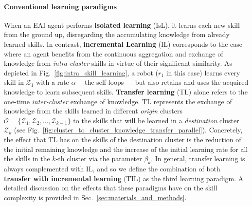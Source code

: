 \documentclass[12pt]{article}
\renewcommand{\emph}[1]{\textit{#1}}
\begin{document}
\paragraph*{Conventional learning paradigms} 
When an EAI agent performs \textbf{isolated learning} (IsL), it learns each new skill from the ground up, disregarding the accumulating knowledge from already learned skills. In contrast, \textbf{incremental Learning} (IL) corresponds to the case where an agent benefits from the continuous aggregation and exchange of knowledge from \emph{intra-cluster} skills in virtue of their significant similarity. As depicted in Fig.~\ref{fig:intra_skill_learning}, a robot ($r_1$ in this case) learns every skill in $\mathcal{Z}_1$ with a rate $\alpha$ ---the self-loops --- but also retains and uses the acquired knowledge to learn subsequent skills. \textbf{Transfer learning} (TL) alone refers to the one-time \emph{inter-cluster} exchange of knowledge. TL represents the exchange of knowledge from the skills learned in different \emph{origin} clusters $\mathcal{O} = \{ \mathcal{Z}_1,\mathcal{Z}_2,\ldots,\mathcal{Z}_{k-1} \}$ to the skills that will be learned in a \emph{destination} cluster $\mathcal{Z}_k$ (see Fig.~\ref{fig:cluster_to_cluster_knowledge_transfer_parallel}). Concretely, the effect that TL has on the skills of the destination cluster is the reduction of the initial remaining knowledge and the increase of the initial learning rate for all the skills in the $k$-th cluster via the parameter $\beta_k$. In general, transfer learning is always complemented with IL, and so we define the combination of both \textbf{transfer with incremental learning} (TIL) as the third learning paradigm.  %
A detailed discussion on the effects that these paradigms have on the skill complexity is provided in Sec.~\ref{sec:materials_and_methods}.

\end{document}
